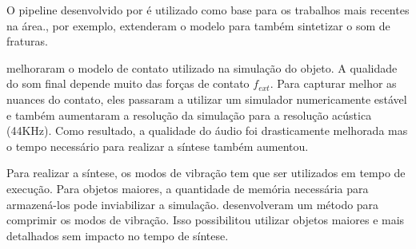 O pipeline desenvolvido por \cite{james2006precomputed} é utilizado como base para os trabalhos mais recentes na área.\cite{zheng2010rigid}, por exemplo, extenderam o modelo para também sintetizar o som de fraturas.

\cite{zheng2011toward} melhoraram o modelo de contato utilizado na simulação do objeto. A qualidade do som final depende muito das forças de contato $f_{ext}$. Para capturar melhor as nuances do contato, eles passaram a utilizar um simulador numericamente estável \cite{kaufman2008staggered} e também aumentaram a resolução da simulação para a resolução acústica (44KHz). Como resultado, a qualidade do áudio foi drasticamente melhorada mas o tempo necessário para realizar a síntese também aumentou.

Para realizar a síntese, os modos de vibração tem que ser utilizados em tempo de execução. Para objetos maiores, a quantidade de memória necessária para armazená-los pode inviabilizar a simulação. \cite{langlois2014eigenmode} desenvolveram um método para comprimir os modos de vibração. Isso possibilitou utilizar objetos maiores e mais detalhados sem impacto no tempo de síntese. 